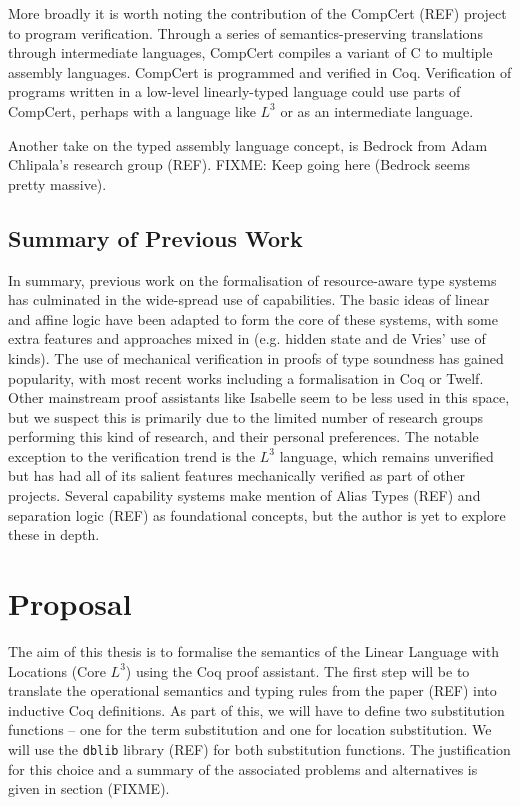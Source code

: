 \documentclass[]{unswthesis}
\newcommand{\SSPHS}{\text{SSPHS }}
\begin{document}
More broadly it is worth noting the contribution of the CompCert (REF) project to program verification. Through a series of semantics-preserving translations through intermediate languages, CompCert compiles a variant of C to multiple assembly languages. CompCert is programmed and verified in Coq. Verification of programs written in a low-level linearly-typed language could use parts of CompCert, perhaps with a language like $L^3$ or \SSPHS as an intermediate language.

Another take on the typed assembly language concept, is Bedrock from Adam Chlipala's research group (REF). FIXME: Keep going here (Bedrock seems pretty massive).


\section{Summary of Previous Work}

In summary, previous work on the formalisation of resource-aware type systems has culminated in the wide-spread use of capabilities. The basic ideas of linear and affine logic have been adapted to form the core of these systems, with some extra features and approaches mixed in (e.g. hidden state and de Vries' use of kinds). The use of mechanical verification in proofs of type soundness has gained popularity, with most recent works including a formalisation in Coq or Twelf. Other mainstream proof assistants like Isabelle seem to be less used in this space, but we suspect this is primarily due to the limited number of research groups performing this kind of research, and their personal preferences. The notable exception to the verification trend is the $L^3$ language, which remains unverified but has had all of its salient features mechanically verified as part of other projects. Several capability systems make mention of Alias Types (REF) and separation logic (REF) as foundational concepts, but the author is yet to explore these in depth.

\chapter{Proposal}
\label{ch:proposal}

The aim of this thesis is to formalise the semantics of the Linear Language with Locations (Core $L^3$) using the Coq proof assistant. The first step will be to translate the operational semantics and typing rules from the paper (REF) into inductive Coq definitions. As part of this, we will have to define two substitution functions -- one for the term substitution and one for location substitution. We will use the \texttt{dblib} library (REF) for both substitution functions. The justification for this choice and a summary of the associated problems and alternatives is given in section (FIXME).
\end{document}
